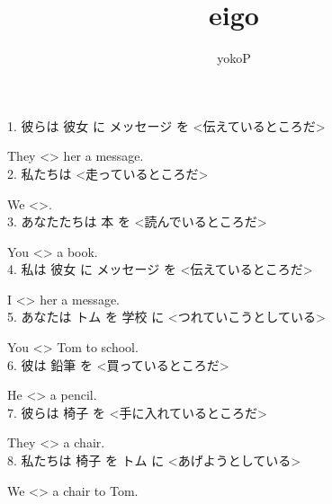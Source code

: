 \documentclass[uplatex,
paper=a4,
fontsize=18pt,
jafontsize=16pt,
number_of_lines=30,
line_length=30zh,
baselineskip=25pt,
]{jlreq}
\author{yokoP}
\title{eigo}
\begin{document}
1.  彼らは 彼女 に メッセージ を <伝えているところだ>

  They <\hspace{3em}\hspace{3em}\hspace{2em}> her a message.
\\

2.  私たちは <走っているところだ>

  We <\hspace{3em}\hspace{3em}\hspace{2em}>.
\\

3.  あなたたちは 本 を <読んでいるところだ>

  You <\hspace{3em}\hspace{3em}\hspace{2em}> a book.
\\

4.  私は 彼女 に メッセージ を <伝えているところだ>

  I <\hspace{3em}\hspace{3em}\hspace{2em}> her a message.
\\

5.  あなたは トム を 学校 に <つれていこうとしている>

  You <\hspace{3em}\hspace{3em}\hspace{2em}> Tom to school.
\\

6.  彼は 鉛筆 を <買っているところだ>

  He <\hspace{3em}\hspace{3em}\hspace{2em}> a pencil.
\\

7.  彼らは 椅子 を <手に入れているところだ>

  They <\hspace{3em}\hspace{3em}\hspace{2em}> a chair.
\\

8.  私たちは 椅子 を トム に <あげようとしている>

  We <\hspace{3em}\hspace{3em}\hspace{2em}> a chair to Tom.
\\
\end{document}
